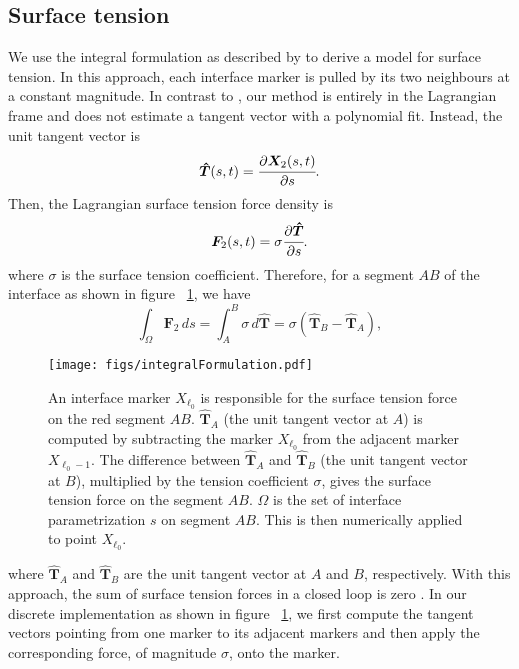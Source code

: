 \documentclass{jfm}
\begin{document}
\subsection{Surface tension}
We use the integral formulation as described by \citet{popinet2018numerical} to derive a model for surface tension. In this approach, each interface marker is pulled by its two neighbours at a constant magnitude. In contrast to \citep{tryggvason2001front}, our method is entirely in the Lagrangian frame and does not estimate a tangent vector with a polynomial fit. Instead, the unit tangent vector is 
\begin{equation}
\bm{\hat{T}}(s, t) = \cfrac{\partial \bm{X}_2(s, t)}{\partial s}. 
\end{equation}
Then, the Lagrangian surface tension force density is
\begin{equation}
\bm{F}_2(s,t) = \sigma \cfrac{\partial \bm{\hat{T}}}{\partial s}. 
\end{equation}
where $\sigma$ is the surface tension coefficient. 
Therefore, for a segment $AB$ of the interface as shown in figure ~\ref{fig:integralFormulation}, we have
\begin{equation}
\int_{\Omega} \bm{F}_2 \, ds = \int_{A}^{B} \sigma \, d \bm{\hat{T}} = \sigma (\bm{\hat{T}}_B - \bm{\hat{T}}_A),
\end{equation}
 \label{eq:tension}
\begin{figure}
    \centering
    \texttt{[image: figs/integralFormulation.pdf]}
    \caption{\label{fig:integralFormulation}
        An interface marker $X_{\ell_0}$ is responsible for the surface tension force on the red segment $AB$. $\bm{\hat{T}}_A$ (the unit tangent vector at $A$) is computed by subtracting the marker $X_{\ell_0}$ from the adjacent marker $X_{\ell_0-1}$. The difference between $\bm{\hat{T}}_A$ and $\bm{\hat{T}}_B$ (the unit tangent vector at $B$), multiplied by the tension coefficient $\sigma$, gives the surface tension force on the segment $AB$. $\Omega$ is the set of interface parametrization $s$ on segment $AB$. This is then numerically applied to point $X_{\ell_0}$. 
    }
\end{figure}
where $\bm{\hat{T}}_A$ and $\bm{\hat{T}}_B$ are the unit tangent vector at $A$ and $B$, respectively. With this approach, the sum of surface tension forces in a closed loop is zero \citep{popinet2018numerical}. In our discrete implementation as shown in figure ~\ref{fig:integralFormulation}, we first compute the tangent vectors pointing from one marker to its adjacent markers and then apply the corresponding force, of magnitude $\sigma$, onto the marker. 
\end{document}
